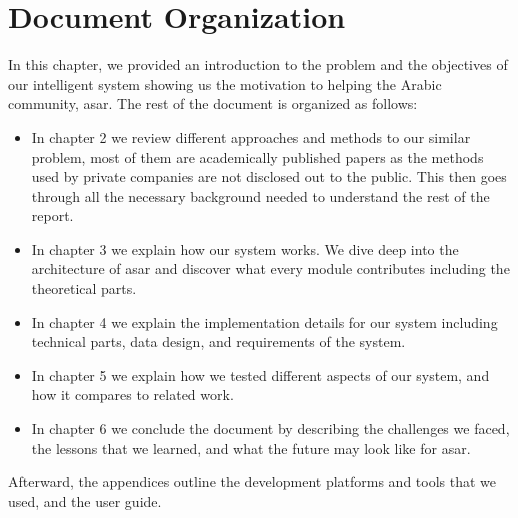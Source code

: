 \section{Document Organization}
In this chapter, we provided an introduction to the problem and the objectives of our intelligent system showing us the motivation to helping the Arabic community, \acrshort{asar}. The rest of the document is organized as follows:
\begin{itemize}[itemsep=1pt, topsep=5pt]
    \item In chapter 2 we review different approaches and methods to our similar problem, most of them are academically published papers as the methods used by private companies are not disclosed out to the public. This then goes through all the necessary background needed to understand the rest of the report.
    \item In chapter 3 we explain how our system works. We dive deep into the architecture of \acrshort{asar} and discover what every module contributes including the theoretical parts.
    \item In chapter 4 we explain the implementation details for our system including technical parts, data design, and requirements of the system.
    \item In chapter 5 we explain how we tested different aspects of our system, and how it compares to related work.
    \item In chapter 6 we conclude the document by describing the challenges we faced, the lessons that we learned, and what the future may look like for \acrshort{asar}.
\end{itemize}

Afterward, the appendices outline the development platforms and tools that we used, and the user guide.

